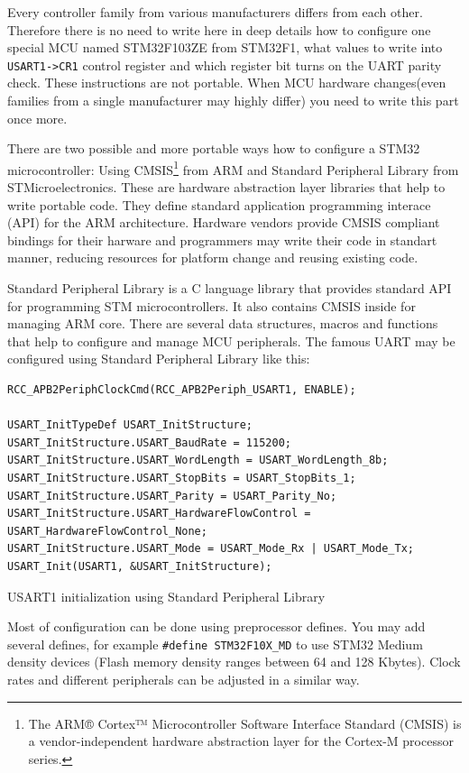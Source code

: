 Every controller family from various manufacturers differs from each other.
Therefore there is no need to write here in deep details how to configure one
special MCU named STM32F103ZE from STM32F1, what values to write into
\texttt{USART1->CR1} control register and which register bit turns on the UART
parity check. These instructions are not portable. When MCU hardware
changes(even families from a single manufacturer may highly differ) you need to
write this part once more.

There are two possible and more portable ways how to configure a STM32
microcontroller: Using CMSIS\footnote{The ARM® Cortex™ Microcontroller Software
Interface Standard (CMSIS) is a vendor-independent hardware abstraction layer for the Cortex-M processor series.}
from ARM and Standard Peripheral Library from STMicroelectronics. These are
hardware abstraction layer libraries that help to write portable code. They
define standard  application programming interace (API) for the ARM
architecture. Hardware vendors provide CMSIS compliant bindings for their
harware and programmers may write their code in standart manner, reducing
resources for platform change and reusing existing code.

Standard Peripheral Library is a C language library that provides standard API
for programming STM microcontrollers. It also contains CMSIS inside for
managing ARM core. There are several data structures, macros and functions that
help to configure and manage MCU peripherals.
The famous UART may be configured using Standard Peripheral Library like this:

\begin{listing}[H]
\begin{verbatim}
RCC_APB2PeriphClockCmd(RCC_APB2Periph_USART1, ENABLE);

USART_InitTypeDef USART_InitStructure;
USART_InitStructure.USART_BaudRate = 115200;
USART_InitStructure.USART_WordLength = USART_WordLength_8b;
USART_InitStructure.USART_StopBits = USART_StopBits_1;
USART_InitStructure.USART_Parity = USART_Parity_No;
USART_InitStructure.USART_HardwareFlowControl = USART_HardwareFlowControl_None;
USART_InitStructure.USART_Mode = USART_Mode_Rx | USART_Mode_Tx;
USART_Init(USART1, &USART_InitStructure);
\end{verbatim}
\caption{USART1 initialization using Standard Peripheral Library}
\label{lst:uart_init_example}
\end{listing} 

Most of configuration can be done using preprocessor defines.
You may add several defines, for example \texttt{\#define STM32F10X\_MD} to use
STM32 Medium density devices (Flash memory density ranges between 64 and 128
Kbytes). Clock rates and different peripherals can be adjusted in a similar way.

